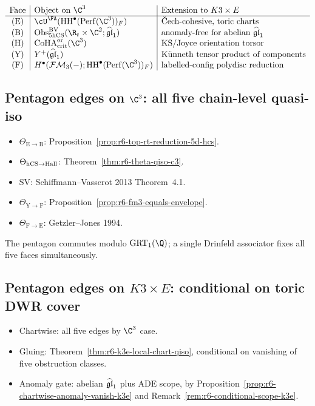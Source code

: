 \[
\begin{array}{c|l|l}
\text{Face} & \text{Object on } \C^3 & \text{Extension to } K3\times E \\ \hline
(\mathrm E) & \cU^\FA(\HH^\bullet(\Perf(\C^3))_F) & \text{\v{C}ech-cohesive, toric charts} \\
(\mathrm B) & \Obs^\BV_{5\hCS}(\R_t\times\C^2;\ghat) & \text{anomaly-free for abelian } \ghat \\
(\mathrm H) & \CoHA_{\mathrm{crit}}^{\mathrm{or}}(\C^3) & \text{KS/Joyce orientation torsor} \\
(\mathrm Y) & Y^+(\ghat) & \text{Künneth tensor product of components} \\
(\mathrm F) & H^\bullet(\FM_3(-);\HH^\bullet(\Perf(\C^3))_F) & \text{labelled-config polydisc reduction}
\end{array}
\]

\subsection*{Pentagon edges on $\C^3$: all five chain-level quasi-iso}

\begin{itemize}
\item $\Theta_{\mathrm E\to\mathrm B}$: Proposition~\ref{prop:r6-top-rt-reduction-5d-hcs}.
\item $\Theta_{\mathrm{hCS}\to\mathrm{Hall}}$: Theorem~\ref{thm:r6-theta-qiso-c3}.
\item SV: Schiffmann--Vasserot 2013 Theorem~4.1.
\item $\Theta_{\mathrm Y\to\mathrm F}$: Proposition~\ref{prop:r6-fm3-equals-envelope}.
\item $\Theta_{\mathrm F\to\mathrm E}$: Getzler--Jones 1994.
\end{itemize}

The pentagon commutes modulo $\GRT_1(\Q)$; a single Drinfeld associator
fixes all five faces simultaneously.

\subsection*{Pentagon edges on $K3\times E$: conditional on toric DWR cover}

\begin{itemize}
\item Chartwise: all five edges by $\C^3$ case.
\item Gluing: Theorem~\ref{thm:r6-k3e-local-chart-qiso}, conditional on
vanishing of five obstruction classes.
\item Anomaly gate: abelian $\widehat{\mathfrak{gl}}_1$ plus ADE scope, by
Proposition~\ref{prop:r6-chartwise-anomaly-vanish-k3e} and
Remark~\ref{rem:r6-conditional-scope-k3e}.
\end{itemize}

